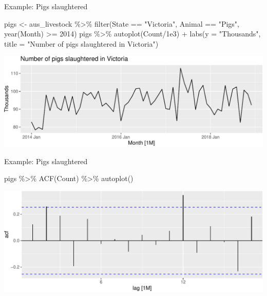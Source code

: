 \documentclass[14pt,ignorenonframetext,aspectratio=169]{beamer}
\newenvironment{Shaded}{\begin{snugshade}}{\end{snugshade}}
\newcommand{\AttributeTok}[1]{\textcolor[rgb]{0.77,0.63,0.00}{#1}}
\newcommand{\DecValTok}[1]{\textcolor[rgb]{0.00,0.00,0.81}{#1}}
\newcommand{\FloatTok}[1]{\textcolor[rgb]{0.00,0.00,0.81}{#1}}
\newcommand{\FunctionTok}[1]{\textcolor[rgb]{0.00,0.00,0.00}{#1}}
\newcommand{\NormalTok}[1]{#1}
\newcommand{\OtherTok}[1]{\textcolor[rgb]{0.56,0.35,0.01}{#1}}
\newcommand{\SpecialCharTok}[1]{\textcolor[rgb]{0.00,0.00,0.00}{#1}}
\newcommand{\StringTok}[1]{\textcolor[rgb]{0.31,0.60,0.02}{#1}}
\renewenvironment{Shaded}{\color{black}\begin{snugshade}\color{black}}{\end{snugshade}}
\renewenvironment{Shaded}{\color{black}\fontsize{10}{10}\sf\begin{snugshade}\color{black}}{\end{snugshade}}
\begin{document}
\begin{frame}[fragile]{Example: Pigs slaughtered}
\protect\hypertarget{example-pigs-slaughtered}{}
\fontsize{10}{10}\sf

\begin{Shaded}
\begin{Highlighting}[]
\NormalTok{pigs }\OtherTok{\textless{}{-}}\NormalTok{ aus\_livestock }\SpecialCharTok{\%\textgreater{}\%}
  \FunctionTok{filter}\NormalTok{(State }\SpecialCharTok{==} \StringTok{"Victoria"}\NormalTok{, Animal }\SpecialCharTok{==} \StringTok{"Pigs"}\NormalTok{, }\FunctionTok{year}\NormalTok{(Month) }\SpecialCharTok{\textgreater{}=} \DecValTok{2014}\NormalTok{)}
\NormalTok{pigs }\SpecialCharTok{\%\textgreater{}\%} \FunctionTok{autoplot}\NormalTok{(Count}\SpecialCharTok{/}\FloatTok{1e3}\NormalTok{) }\SpecialCharTok{+}
  \FunctionTok{labs}\NormalTok{(}\AttributeTok{y =} \StringTok{"Thousands"}\NormalTok{, }\AttributeTok{title =} \StringTok{"Number of pigs slaughtered in Victoria"}\NormalTok{)}
\end{Highlighting}
\end{Shaded}

\includegraphics{2-tsgraphics_files/figure-beamer/unnamed-chunk-34-1.pdf}
\end{frame}

\begin{frame}[fragile]{Example: Pigs slaughtered}
\protect\hypertarget{example-pigs-slaughtered-1}{}
\fontsize{10}{10}\sf

\begin{Shaded}
\begin{Highlighting}[]
\NormalTok{pigs }\SpecialCharTok{\%\textgreater{}\%} \FunctionTok{ACF}\NormalTok{(Count) }\SpecialCharTok{\%\textgreater{}\%} \FunctionTok{autoplot}\NormalTok{()}
\end{Highlighting}
\end{Shaded}

\includegraphics{2-tsgraphics_files/figure-beamer/unnamed-chunk-35-1.pdf}
\end{frame}
\end{document}
